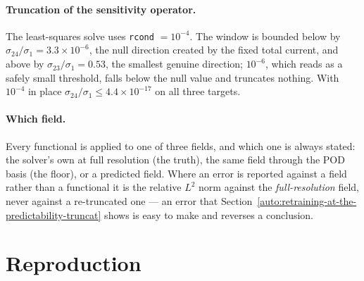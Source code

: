 \documentclass[11pt,a4paper]{article}
\theoremstyle{plain}
\theoremstyle{definition}
\theoremstyle{remark}
\begin{document}
\paragraph{Truncation of the sensitivity operator.} The least-squares solve uses
\texttt{rcond} $=10^{-4}$. The window is bounded below by
$\sigma_{24}/\sigma_1 = 3.3\times10^{-6}$, the null direction created by the
fixed total current, and above by $\sigma_{23}/\sigma_1 = 0.53$, the smallest
genuine direction; $10^{-6}$, which reads as a safely small threshold, falls
below the null value and truncates nothing. With $10^{-4}$ in place
$\sigma_{24}/\sigma_1 \le 4.4\times10^{-17}$ on all three targets.

\paragraph{Which field.} Every functional is applied to one of three fields, and
which one is always stated: the solver's own at full resolution (the truth), the
same field through the POD basis (the floor), or a predicted field. Where an
error is reported against a field rather than a functional it is the relative
$L^2$ norm against the \emph{full-resolution} field, never against a
re-truncated one --- an error that Section~\ref{auto:retraining-at-the-predictability-truncat} shows is easy to
make and reverses a conclusion.

\section{Reproduction}
\label{app:repro}
\end{document}
